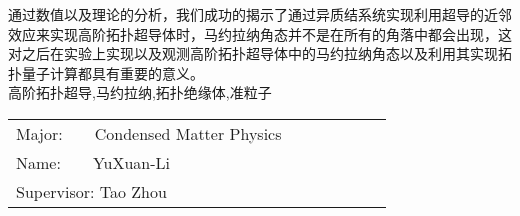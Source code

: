  通过数值以及理论的分析，我们成功的揭示了通过异质结系统实现利用超导的近邻效应来实现高阶拓扑超导体时，马约拉纳角态并不是在所有的角落中都会出现，这对之后在实验上实现以及观测高阶拓扑超导体中的马约拉纳角态以及利用其实现拓扑量子计算都具有重要的意义。\\
\quad{}高阶拓扑超导,马约拉纳,拓扑绝缘体,准粒子

\newpage
{\centering {}}
\bigskip
{
	\begin{center}
		\begin{tabular}{l}
			Major:$\quad\quad$Condensed Matter Physics$\quad\qquad$$\quad\qquad$\\
			Name:$\quad\quad$YuXuan-Li$\quad\qquad$$\quad\qquad$\\
			Supervisor: Tao Zhou$\quad\qquad$\\
		\end{tabular}
\end{center}}
\bigskip
\bigskip
\bigskip

{}

